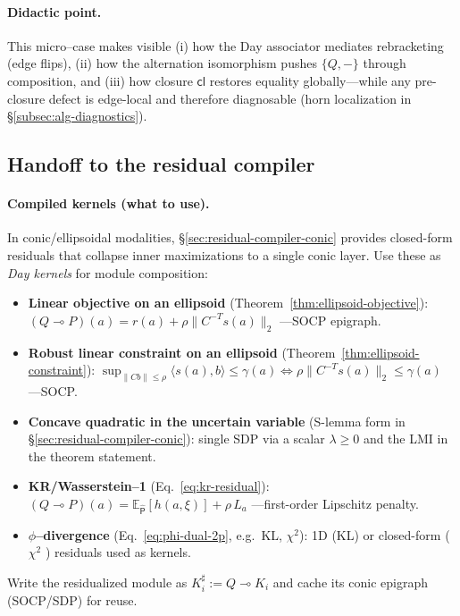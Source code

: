\documentclass[11pt]{article}
\numberwithin{equation}{section}
\theoremstyle{upright}
\newcommand{\resid}{\multimap}
\begin{document}
\paragraph{Didactic point.}
This micro–case makes visible (i) how the Day associator mediates rebracketing (edge flips),
(ii) how the alternation isomorphism pushes $\{Q,-\}$ through composition, and
(iii) how closure $\mathsf{cl}$ restores equality globally—while any pre-closure defect is
edge-local and therefore diagnosable (horn localization in \S\ref{subsec:alg-diagnostics}).

\subsection{Handoff to the residual compiler}
\label{subsec:handoff}

\paragraph{Compiled kernels (what to use).}
In conic/ellipsoidal modalities, \S\ref{sec:residual-compiler-conic} provides
closed-form residuals that collapse inner maximizations to a single conic layer.
Use these as \emph{Day kernels} for module composition:
\begin{itemize}[leftmargin=*, itemsep=.3ex]
\item \textbf{Linear objective on an ellipsoid} (Theorem~\ref{thm:ellipsoid-objective}):
\(
(Q\resid P)(a)=r(a)+\rho\|C^{-T}s(a)\|_2
\)
\;—\;SOCP epigraph.
\item \textbf{Robust linear constraint on an ellipsoid} (Theorem~\ref{thm:ellipsoid-constraint}):
\(
\sup_{\|Cb\|\le\rho}\langle s(a),b\rangle\le \gamma(a)
\iff
\rho\|C^{-T}s(a)\|_2\le \gamma(a)
\)
\;—\;SOCP.
\item \textbf{Concave quadratic in the uncertain variable} (S-lemma form in \S\ref{sec:residual-compiler-conic}):
single SDP via a scalar $\lambda\ge 0$ and the LMI in the theorem statement.
\item \textbf{KR/Wasserstein–1} (Eq.~\eqref{eq:kr-residual}):
\(
(Q\resid P)(a)=\mathbb E_{\widehat{\mathsf P}}[h(a,\xi)]+\rho\,L_a
\)
\;—\;first-order Lipschitz penalty.
\item \textbf{$\phi$–divergence} (Eq.~\eqref{eq:phi-dual-2p}, e.g.\ KL, $\chi^2$):
1D (KL) or closed-form ( $\chi^2$ ) residuals used as kernels.
\end{itemize}
Write the residualized module as $K_i^\sharp := Q\multimap K_i$ and cache its conic
epigraph (SOCP/SDP) for reuse.
\end{document}
